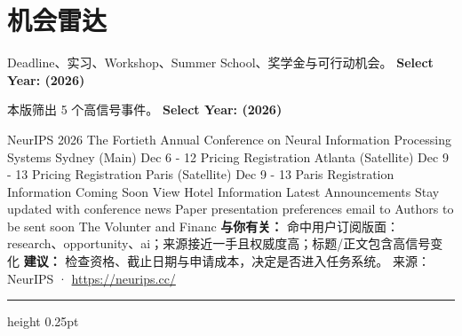 \documentclass[10.5pt]{ctexart}
\begin{document}
\section*{机会雷达}
{\color{ormuted} Deadline、实习、Workshop、Summer School、奖学金与可行动机会。}
\vspace{2mm}
{\LARGE\bfseries Select Year: (2026)}\par
\vspace{1mm}
{\color{ormuted} 本版筛出 5 个高信号事件。}
\vspace{3mm}
{\Large\bfseries Select Year: (2026)}\par
NeurIPS 2026 The Fortieth Annual Conference on Neural Information Processing Systems Sydney (Main) Dec 6 - 12 Pricing Registration Atlanta (Satellite) Dec 9 - 13 Pricing Registration Paris (Satellite) Dec 9 - 13 Paris Registration Information Coming Soon View Hotel Information Latest Announcements Stay updated with conference news Paper presentation preferences email to Authors to be sent soon The Volunter and Financ
\textbf{与你有关：} 命中用户订阅版面：research、opportunity、ai；来源接近一手且权威度高；标题/正文包含高信号变化
\textbf{建议：} 检查资格、截止日期与申请成本，决定是否进入任务系统。
{\footnotesize\color{ormuted} 来源：NeurIPS · \url{https://neurips.cc/}}
\vspace{4mm}
\hrule height 0.25pt
\vspace{3mm}
\end{document}
